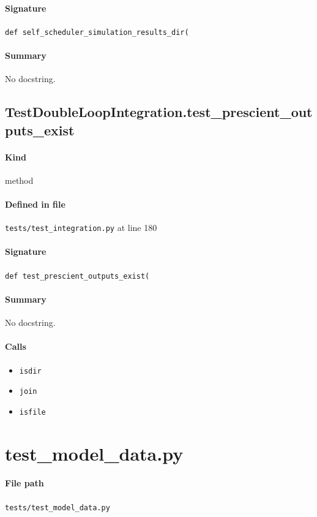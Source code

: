 \documentclass[11pt]{report}
\begin{document}
\paragraph{Signature} \texttt{def self\_scheduler\_simulation\_results\_dir(}
\paragraph{Summary} No docstring.
\subsection{TestDoubleLoopIntegration.test\_prescient\_outputs\_exist}
\label{def:tests-test_integration.py:TestDoubleLoopIntegration.test_prescient_outputs_exist:L180}
\paragraph{Kind} method
\paragraph{Defined in file} \texttt{tests/test\_integration.py} at line 180
\paragraph{Signature} \texttt{def test\_prescient\_outputs\_exist(}
\paragraph{Summary} No docstring.
\paragraph{Calls}
\begin{itemize}[leftmargin=*]
  \item \texttt{isdir}
  \item \texttt{join}
  \item \texttt{isfile}
\end{itemize}

\section{test\_model\_data.py}
\label{file:tests-test_model_data.py}
\paragraph{File path} \texttt{tests/test\_model\_data.py}
\end{document}
